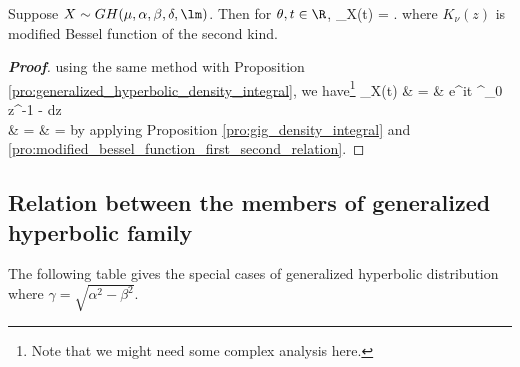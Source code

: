 \begin{proposition}\label{pro:mgf_generalized_hyperbolic}
Suppose $X \sim GH(\mu,\alpha,\beta,\delta,\lm)$. Then for $\theta,t\in \R$,%
\be          %
\phi_X(t) =  .
\ee
where $K_\nu(z)$ is modified Bessel function of the second kind.
\end{proposition}

\begin{proof}[\bf Proof]
using the same method with Proposition \ref{pro:generalized_hyperbolic_density_integral}, we have\footnote{Note that we might need some complex analysis here.}
\beast
\phi_X(t) & = &  e^{i\mu t}  \int^\infty_0   z^{-1 - \lm } \exp{}dz  \\
& = &   
=  
\eeast
by applying Proposition \ref{pro:gig_density_integral} and \ref{pro:modified_bessel_function_first_second_relation}.  %
\end{proof}

\subsection{Relation between the members of generalized hyperbolic family}

The following table gives the special cases of generalized hyperbolic distribution where $\gamma = \sqrt{\alpha^2-\beta^2}$.

